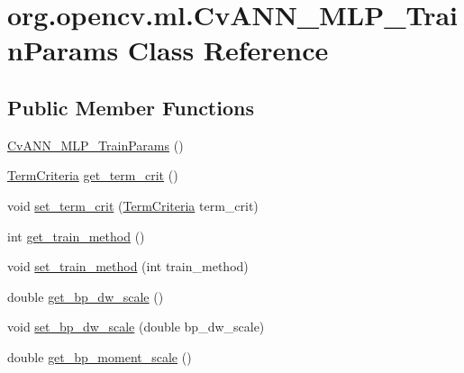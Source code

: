 \hypertarget{classorg_1_1opencv_1_1ml_1_1_cv_a_n_n___m_l_p___train_params}{}\section{org.\+opencv.\+ml.\+Cv\+A\+N\+N\+\_\+\+M\+L\+P\+\_\+\+Train\+Params Class Reference}
\label{classorg_1_1opencv_1_1ml_1_1_cv_a_n_n___m_l_p___train_params}
\subsection*{Public Member Functions}
\begin{DoxyCompactItemize}
\item 
\mbox{\hyperlink{classorg_1_1opencv_1_1ml_1_1_cv_a_n_n___m_l_p___train_params_adaf598d18f7c971c18ed0437ffab2bd0}{Cv\+A\+N\+N\+\_\+\+M\+L\+P\+\_\+\+Train\+Params}} ()
\item 
\mbox{\hyperlink{classorg_1_1opencv_1_1core_1_1_term_criteria}{Term\+Criteria}} \mbox{\hyperlink{classorg_1_1opencv_1_1ml_1_1_cv_a_n_n___m_l_p___train_params_a4681a1b25b4417283287a7d1bb0db0c2}{get\+\_\+term\+\_\+crit}} ()
\item 
void \mbox{\hyperlink{classorg_1_1opencv_1_1ml_1_1_cv_a_n_n___m_l_p___train_params_a67ba92ccead1627d7af154f22cffa6cc}{set\+\_\+term\+\_\+crit}} (\mbox{\hyperlink{classorg_1_1opencv_1_1core_1_1_term_criteria}{Term\+Criteria}} term\+\_\+crit)
\item 
int \mbox{\hyperlink{classorg_1_1opencv_1_1ml_1_1_cv_a_n_n___m_l_p___train_params_a8a82d55838dab6840b33badc0a95fd9f}{get\+\_\+train\+\_\+method}} ()
\item 
void \mbox{\hyperlink{classorg_1_1opencv_1_1ml_1_1_cv_a_n_n___m_l_p___train_params_a64c0c0555f7d31772728f80f46ef6302}{set\+\_\+train\+\_\+method}} (int train\+\_\+method)
\item 
double \mbox{\hyperlink{classorg_1_1opencv_1_1ml_1_1_cv_a_n_n___m_l_p___train_params_a197cabaeaba3c0484714061d07c074b2}{get\+\_\+bp\+\_\+dw\+\_\+scale}} ()
\item 
void \mbox{\hyperlink{classorg_1_1opencv_1_1ml_1_1_cv_a_n_n___m_l_p___train_params_a96b84dce4676dce83c120aa0f63caef6}{set\+\_\+bp\+\_\+dw\+\_\+scale}} (double bp\+\_\+dw\+\_\+scale)
\item 
double \mbox{\hyperlink{classorg_1_1opencv_1_1ml_1_1_cv_a_n_n___m_l_p___train_params_a0742799ebe7f2a265dee1453b39a9cfe}{get\+\_\+bp\+\_\+moment\+\_\+scale}} ()

\end{DoxyCompactItemize}
